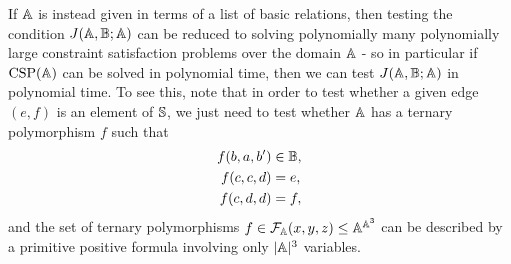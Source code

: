 \documentclass[letterpaper,11pt]{article}
\DeclareMathOperator{\CSP}{CSP}
\begin{document}
If $\mathbb{A}$ is instead given in terms of a list of basic relations, then testing the condition $J(\mathbb{A},\mathbb{B};\mathbb{A})$ can be reduced to solving polynomially many polynomially large constraint satisfaction problems over the domain $\mathbb{A}$ - so in particular if $\CSP(\bA)$ can be solved in polynomial time, then we can test $J(\mathbb{A},\mathbb{B};\mathbb{A})$ in polynomial time. To see this, note that in order to test whether a given edge $(e,f)$ is an element of $\mathbb{S}$, we just need to test whether $\mathbb{A}$ has a ternary polymorphism $f$ such that
\begin{align*}
f(b,a,b') &\in \mathbb{B},\\
f(c,c,d) &= e,\\
f(c,d,d) &= f,
\end{align*}
and the set of ternary polymorphisms $f \in \mathcal{F}_{\mathbb{A}}(x,y,z) \le \mathbb{A}^{\mathbb{A}^3}$ can be described by a primitive positive formula involving only $|\mathbb{A}|^3$ variables.
\end{document}
